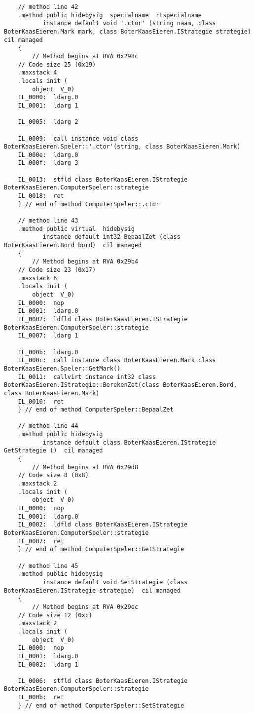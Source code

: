 \begin{lstlisting}
    // method line 42
    .method public hidebysig  specialname  rtspecialname 
           instance default void '.ctor' (string naam, class BoterKaasEieren.Mark mark, class BoterKaasEieren.IStrategie strategie)  cil managed 
    {
        // Method begins at RVA 0x298c
	// Code size 25 (0x19)
	.maxstack 4
	.locals init (
		object	V_0)
	IL_0000:  ldarg.0 
	IL_0001:  ldarg 1

	IL_0005:  ldarg 2

	IL_0009:  call instance void class BoterKaasEieren.Speler::'.ctor'(string, class BoterKaasEieren.Mark)
	IL_000e:  ldarg.0 
	IL_000f:  ldarg 3

	IL_0013:  stfld class BoterKaasEieren.IStrategie BoterKaasEieren.ComputerSpeler::strategie
	IL_0018:  ret 
    } // end of method ComputerSpeler::.ctor

    // method line 43
    .method public virtual  hidebysig 
           instance default int32 BepaalZet (class BoterKaasEieren.Bord bord)  cil managed 
    {
        // Method begins at RVA 0x29b4
	// Code size 23 (0x17)
	.maxstack 6
	.locals init (
		object	V_0)
	IL_0000:  nop 
	IL_0001:  ldarg.0 
	IL_0002:  ldfld class BoterKaasEieren.IStrategie BoterKaasEieren.ComputerSpeler::strategie
	IL_0007:  ldarg 1

	IL_000b:  ldarg.0 
	IL_000c:  call instance class BoterKaasEieren.Mark class BoterKaasEieren.Speler::GetMark()
	IL_0011:  callvirt instance int32 class BoterKaasEieren.IStrategie::BerekenZet(class BoterKaasEieren.Bord, class BoterKaasEieren.Mark)
	IL_0016:  ret 
    } // end of method ComputerSpeler::BepaalZet

    // method line 44
    .method public hidebysig 
           instance default class BoterKaasEieren.IStrategie GetStrategie ()  cil managed 
    {
        // Method begins at RVA 0x29d8
	// Code size 8 (0x8)
	.maxstack 2
	.locals init (
		object	V_0)
	IL_0000:  nop 
	IL_0001:  ldarg.0 
	IL_0002:  ldfld class BoterKaasEieren.IStrategie BoterKaasEieren.ComputerSpeler::strategie
	IL_0007:  ret 
    } // end of method ComputerSpeler::GetStrategie

    // method line 45
    .method public hidebysig 
           instance default void SetStrategie (class BoterKaasEieren.IStrategie strategie)  cil managed 
    {
        // Method begins at RVA 0x29ec
	// Code size 12 (0xc)
	.maxstack 2
	.locals init (
		object	V_0)
	IL_0000:  nop 
	IL_0001:  ldarg.0 
	IL_0002:  ldarg 1

	IL_0006:  stfld class BoterKaasEieren.IStrategie BoterKaasEieren.ComputerSpeler::strategie
	IL_000b:  ret 
    } // end of method ComputerSpeler::SetStrategie


\end{lstlisting}
